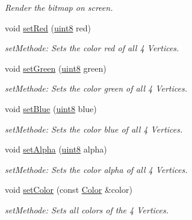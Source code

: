 \begin{DoxyCompactItemize}
\begin{DoxyCompactList}\small\item\em Render the bitmap on screen. \item\end{DoxyCompactList}\item 
void \hyperlink{class_f2_c_1_1_sprite_base_a4a931a54423a0aae08eacc30e96d485f}{setRed} (\hyperlink{namespace_f2_c_a711deb33697d145669b9c0c4fe87c7ca}{uint8} red)
\begin{DoxyCompactList}\small\item\em setMethode: Sets the color red of all 4 Vertices. \item\end{DoxyCompactList}\item 
void \hyperlink{class_f2_c_1_1_sprite_base_a22cb562ef6c8e857cf78cd3037dbfe48}{setGreen} (\hyperlink{namespace_f2_c_a711deb33697d145669b9c0c4fe87c7ca}{uint8} green)
\begin{DoxyCompactList}\small\item\em setMethode: Sets the color green of all 4 Vertices. \item\end{DoxyCompactList}\item 
void \hyperlink{class_f2_c_1_1_sprite_base_ae08702a286ecfde0cf4ef8aacc8c9656}{setBlue} (\hyperlink{namespace_f2_c_a711deb33697d145669b9c0c4fe87c7ca}{uint8} blue)
\begin{DoxyCompactList}\small\item\em setMethode: Sets the color blue of all 4 Vertices. \item\end{DoxyCompactList}\item 
void \hyperlink{class_f2_c_1_1_sprite_base_a476e1be82005a18cce5989a478d3f5a4}{setAlpha} (\hyperlink{namespace_f2_c_a711deb33697d145669b9c0c4fe87c7ca}{uint8} alpha)
\begin{DoxyCompactList}\small\item\em setMethode: Sets the color alpha of all 4 Vertices. \item\end{DoxyCompactList}\item 
void \hyperlink{class_f2_c_1_1_sprite_base_a8dea109774f2021855921952a55dad34}{setColor} (const \hyperlink{class_f2_c_1_1_color}{Color} \&color)
\begin{DoxyCompactList}\small\item\em setMethode: Sets all colors of the 4 Vertices. \item\end{DoxyCompactList}\item 

\end{DoxyCompactItemize}
